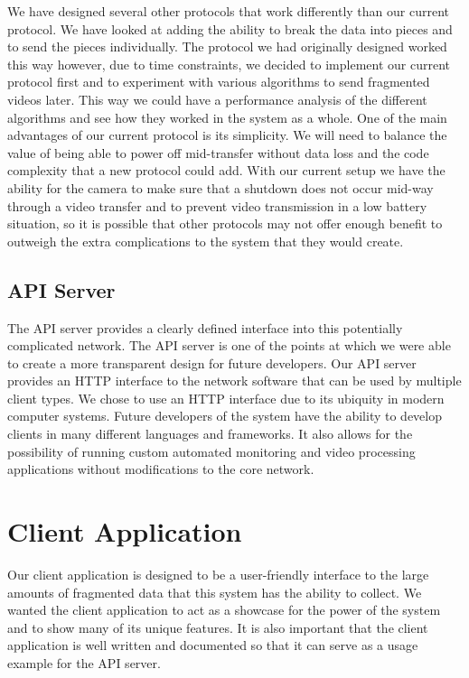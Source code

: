 We have designed several other protocols that work differently than our current
protocol. We have looked at adding the ability to break the data into pieces and
to send the pieces individually. The protocol we had originally designed worked
this way however, due to time constraints, we decided to implement our current
protocol first and to experiment with various algorithms to send fragmented
videos later. This way we could have a performance analysis of the different
algorithms and see how they worked in the system as a whole. One of the main
advantages of our current protocol is its simplicity. We will need to balance
the value of being able to power off mid-transfer without data loss and the code
complexity that a new protocol could add. With our current setup we have the
ability for the camera to make sure that a shutdown does not occur mid-way
through a video transfer and to prevent video transmission in a low battery
situation, so it is possible that other protocols may not offer enough benefit
to outweigh the extra complications to the system that they would create.

\subsection{API Server}

The API server provides a clearly defined interface into this potentially
complicated network. The API server is one of the points at which we were able
to create a more transparent design for future developers. Our API server
provides an HTTP interface to the network software that can be used by multiple
client types. We chose to use an HTTP interface due to its ubiquity in modern
computer systems. Future developers of the system have the ability to develop
clients in many different languages and frameworks. It also allows for the
possibility of running custom automated monitoring and video processing
applications without modifications to the core network.

\section{Client Application}

Our client application is designed to be a user-friendly interface to the large
amounts of fragmented data that this system has the ability to collect. We
wanted the client application to act as a showcase for the power of the system
and to show many of its unique features. It is also important that the client
application is well written and documented so that it can serve as a usage
example for the API server.

